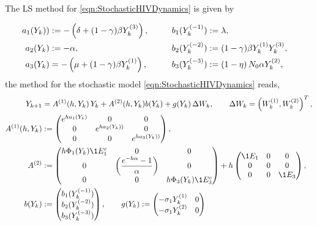 \begin{example}
	The LS method for \eqref{eqn:StochasticHIVDynamics} is given by
	
	\begin{align}
		a_{1}(Y_k)) &:= 
		-\left(
		\delta + (1 - \gamma) \beta Y_k^{(3)}
		\right),		
		& b_1(Y_k^{(-1)}) &:= \lambda, 
		& 
		\notag
		\\
		a_{2}(Y_k) &:= -\alpha,
		&b_2(Y_k^{(-2)}) & :=
		(1-\gamma) \beta Y_{k}^{(1)} Y_{k}^{(3)},
		\notag
		\\
		a_{3}(Y_k) &= 
		-
		\left(
		\mu + (1- \gamma) \beta Y_{k}^{(1)}
		\right),
		\qquad
		&b_{3}(Y_k^{(-3)}) &:= 
		\left(
		1 - \eta 
		\right)
		N_0 \alpha Y_{k}^{(2)},
		\notag			
	\end{align}
	the \SM method for the stochastic model \eqref{eqn:StochasticHIVDynamics} reads,
	\begin{align}
		Y_{k+1} &= A^{(1)}(h,Y_k) \,Y_k + A^{(2)}(h,Y_k)b(Y_k)+ g(Y_k)\, \Delta W_k,
		\qquad \Delta W_k = \left(W_k^{(1)}, W_k^{(2)}\right)^T, 
		\notag\\ 
		A^{(1)}(h,Y_k)&:=
		\begin{pmatrix}
			e^{ha_1(Y_k)}	&	0	&0 \\
			0	&e^{ha_2(Y_k))}	&0\\
			0	&0				&e^{ha_3(Y_k))}
		\end{pmatrix},
		\notag
		\\
		A^{(2)}&:=
		\begin{pmatrix}
			h \Phi_1(Y_k)\1{E_1^c}	&0	&0\\
			0 & 
			\left(\displaystyle
			\frac{e^{-h\alpha} - 1}{\alpha}
			\right) & 0\\
			0 & 0 & h \Phi_3(Y_k)\1{E_3^c} 
		\end{pmatrix}
		+h
		\begin{pmatrix}
			\1{E_1}	&0 			&0\\
			0		&0			&0\\
			0		&0			&\1{E_3}\\
		\end{pmatrix},
	\notag
	\\
	b(Y_k) &:=
	\begin{pmatrix}
		b_1(Y_k^{(-1)})\\
		b_2(Y_k^{(-2)})\\
		b_3(Y_k^{(-3)})
	\end{pmatrix},
	\qquad
	g(Y_k):=
	\begin{pmatrix}
		-\sigma_1 Y_k^{(1)}	&0\\
		-\sigma_1 Y_k^{(2)}	&0\\

\end{pmatrix}
\end{align}
\end{example}
